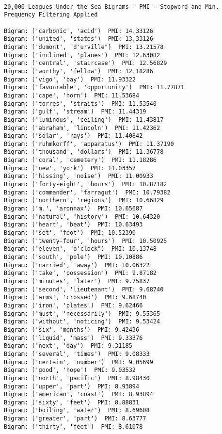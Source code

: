 \documentclass[11pt]{article}
\begin{document}
    \begin{Verbatim}[commandchars=\\\{\}]

20,000 Leagues Under the Sea Bigrams - PMI - Stopword and Min. Frequency Filtering Applied 

Bigram: ('carbonic', 'acid')  PMI: 14.33126
Bigram: ('united', 'states')  PMI: 13.33126
Bigram: ('dumont', "d'urville")  PMI: 13.21578
Bigram: ('inclined', 'planes')  PMI: 12.63082
Bigram: ('central', 'staircase')  PMI: 12.56829
Bigram: ('worthy', 'fellow')  PMI: 12.18286
Bigram: ('vigo', 'bay')  PMI: 11.93322
Bigram: ('favourable', 'opportunity')  PMI: 11.77871
Bigram: ('cape', 'horn')  PMI: 11.53684
Bigram: ('torres', 'straits')  PMI: 11.53540
Bigram: ('gulf', 'stream')  PMI: 11.44319
Bigram: ('luminous', 'ceiling')  PMI: 11.43817
Bigram: ('abraham', 'lincoln')  PMI: 11.42362
Bigram: ('solar', 'rays')  PMI: 11.40842
Bigram: ('ruhmkorff', 'apparatus')  PMI: 11.37190
Bigram: ('thousand', 'dollars')  PMI: 11.36778
Bigram: ('coral', 'cemetery')  PMI: 11.18286
Bigram: ('new', 'york')  PMI: 11.03357
Bigram: ('hissing', 'noise')  PMI: 11.00933
Bigram: ('forty-eight', 'hours')  PMI: 10.87182
Bigram: ('commander', 'farragut')  PMI: 10.79382
Bigram: ('northern', 'regions')  PMI: 10.66829
Bigram: ('m.', 'aronnax')  PMI: 10.65687
Bigram: ('natural', 'history')  PMI: 10.64320
Bigram: ('heart', 'beat')  PMI: 10.63493
Bigram: ('set', 'foot')  PMI: 10.52390
Bigram: ('twenty-four', 'hours')  PMI: 10.50925
Bigram: ('eleven', "o'clock")  PMI: 10.13748
Bigram: ('south', 'pole')  PMI: 10.10886
Bigram: ('carried', 'away')  PMI: 10.06322
Bigram: ('take', 'possession')  PMI: 9.87182
Bigram: ('minutes', 'later')  PMI: 9.75837
Bigram: ('second', 'lieutenant')  PMI: 9.68740
Bigram: ('arms', 'crossed')  PMI: 9.68740
Bigram: ('iron', 'plates')  PMI: 9.62466
Bigram: ('must', 'necessarily')  PMI: 9.55365
Bigram: ('without', 'noticing')  PMI: 9.53424
Bigram: ('six', 'months')  PMI: 9.42436
Bigram: ('liquid', 'mass')  PMI: 9.33376
Bigram: ('next', 'day')  PMI: 9.31185
Bigram: ('several', 'times')  PMI: 9.08333
Bigram: ('certain', 'number')  PMI: 9.05699
Bigram: ('good', 'hope')  PMI: 9.03532
Bigram: ('north', 'pacific')  PMI: 8.98430
Bigram: ('upper', 'part')  PMI: 8.93894
Bigram: ('american', 'coast')  PMI: 8.93894
Bigram: ('sixty', 'feet')  PMI: 8.88831
Bigram: ('boiling', 'water')  PMI: 8.69608
Bigram: ('greater', 'part')  PMI: 8.63777
Bigram: ('thirty', 'feet')  PMI: 8.61078

    \end{Verbatim}
\end{document}
